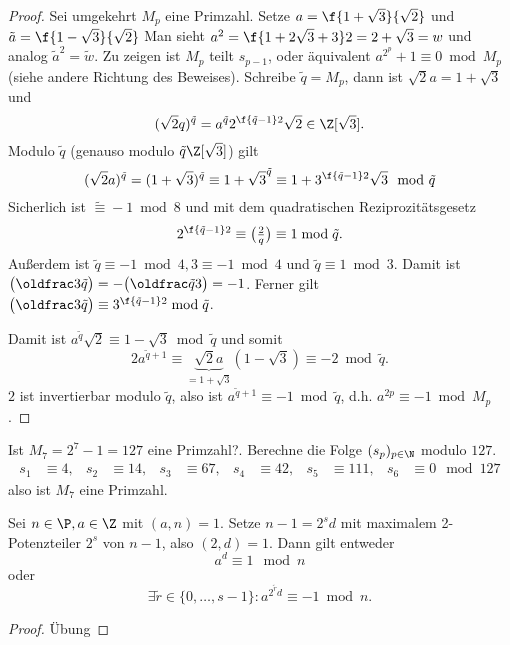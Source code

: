 \begin{st}
\begin{proof}
		Sei umgekehrt $M_p$ eine Primzahl.
		Setze $a = \f{1 + \sqrt{3}}{\sqrt{2}}$ und $\tilde a = \f{1 - \sqrt{3}}{\sqrt{2}}$
		Man sieht $a^2 = \f{1 + 2\sqrt{3} + 3}2 = 2 + \sqrt{3} = w$ und analog $\tilde a^2 = \tilde w$.
		Zu zeigen ist $M_p$ teilt $s_{p-1}$, oder äquivalent $a^{2^p} + 1 \equiv 0 \bmod M_p$ (siehe andere Richtung des Beweises).
		Schreibe $\tilde q = M_p$, dann ist $\sqrt{2} a = 1 + \sqrt{3}$ und
		\[
			(\sqrt{2} q)^{\tilde q} = a^{\tilde q} 2^{\f{\tilde q - 1}2} \sqrt{2}
			\in \Z[\sqrt{3}].
		\]
		Modulo $\tilde q$ (genauso modulo $\tilde q \Z[\sqrt{3}]$) gilt
		\[
			(\sqrt 2 a)^{\tilde q}
			= (1 + \sqrt 3)^{\tilde q}
			\equiv 1 + \sqrt{3}^{\tilde q}
			\equiv 1 + 3^{\f{\tilde q -1}2} \sqrt{3}
			\mod \tilde q
		\]
		Sicherlich ist $\tilde \equiv -1 \bmod 8$ und mit dem quadratischen Reziprozitätsgesetz
		\[
			2^{\f{\tilde q - 1}2} \equiv \legsym{2}{q}
			\equiv 1 \bmod \tilde q.
		\]
		Außerdem ist $\tilde q \equiv -1 \bmod 4, 3 \equiv -1 \bmod 4$ und $\tilde q \equiv 1 \bmod 3$.
		Damit ist $\legsym{3}{\tilde q} = - \legsym{\tilde q}{3} = -1$.
		Ferner gilt $\legsym{3}{\tilde q} \equiv 3^{\f{\tilde q-1}2} \bmod \tilde q$.

		Damit ist $a^{\tilde q} \sqrt{2} \equiv 1 - \sqrt{3} \bmod \tilde q$ und somit
		\[
			2 a^{\tilde q + 1}
			\equiv \underbrace{\sqrt{2} a}_{=1+\sqrt{3}} (1 - \sqrt{3})
			\equiv -2 \bmod \tilde q.
		\]
		$2$ ist invertierbar modulo $\tilde q$, also ist $a^{\tilde q + 1} \equiv -1 \bmod \tilde q$, d.h. $a^{2p} \equiv -1 \bmod M_p$.
	\end{proof}
\end{st}

\begin{ex*}
	Ist $M_7 = 2^7 - 1 = 127$ eine Primzahl?.
	Berechne die Folge $(s_p)_{p\in \N}$ modulo $127$.
	\begin{align*}
		s_1 &\equiv 4, &
		s_2 &\equiv 14, &
		s_3 &\equiv 67, &
		s_4 &\equiv 42, &
		s_5 &\equiv 111, &
		s_6 &\equiv 0
		\mod 127
	\end{align*}
	also ist $M_7$ eine Primzahl.
\end{ex*}

\begin{prop} \label{3.19}
	Sei $n \in \P, a \in \Z$ mit $(a, n) = 1$.
	Setze $n - 1 = 2^s d$ mit maximalem 2-Potenzteiler $2^s$ von $n-1$, also $(2, d) = 1$.
	Dann gilt entweder
	\[
		a^d \equiv 1 \mod n
	\]
	oder
	\[
		\exists \tilde r \in \{0, \dotsc, s-1\} :
		a^{2^{\tilde r} d} \equiv -1 \bmod n.
	\]
	\begin{proof}
		Übung
	\end{proof}
\end{prop}

